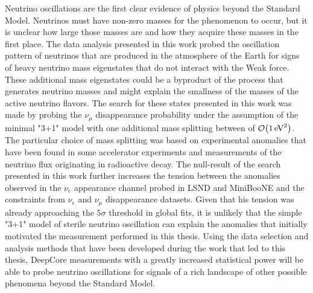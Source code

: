 Neutrino oscillations are the first clear evidence of physics beyond the Standard Model. Neutrinos must have non-zero masses for the phenomenon to occur, but it is unclear how large those masses are and how they acquire these masses in the first place. The data analysis presented in this work probed the oscillation pattern of neutrinos that are produced in the atmosphere of the Earth for signs of heavy neutrino mass eigenstates that do not interact with the Weak force. These additional mass eigenstates could be a byproduct of the process that generates neutrino masses and might explain the smallness of the masses of the active neutrino flavors. The search for these states presented in this work was made by probing the $\nu_\mu$ disappearance probability under the assumption of the minimal "3+1" model with one additional mass splitting between of $\order{\SI{1}{\electronvolt\squared}}$. The particular choice of mass splitting was based on experimental anomalies that have been found in some accelerator experiments and measurements of the neutrino flux originating in radioactive decay. The null-result of the search presented in this work further increases the tension between the anomalies observed in the $\nu_e$ appearance channel probed in LSND and MiniBooNE and the constraints from $\nu_e$ and $\nu_\mu$ disappearance datasets. Given that his tension was already approaching the $5\sigma$ threshold in global fits, it is unlikely that the simple "3+1" model of sterile neutrino oscillation can explain the anomalies that initially motivated the measurement performed in this thesis. Using the data selection and analysis methods that have been developed during the work that led to this thesis, DeepCore measurements with a greatly increased statistical power will be able to probe neutrino oscillations for signals of a rich landscape of other possible phenomena beyond the Standard Model.
